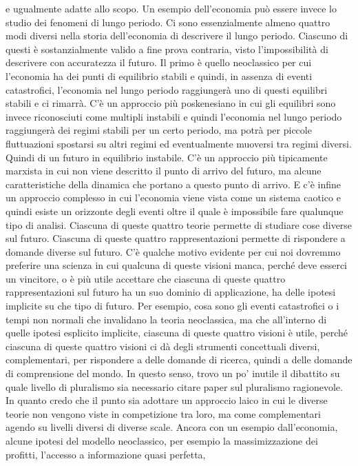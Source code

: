 \documentclass[a4paper, headings=standardclasses]{scrartcl}
\begin{document}
e ugualmente adatte allo scopo.
Un esempio dell'economia può essere invece lo studio dei fenomeni di lungo periodo.
Ci sono essenzialmente almeno quattro modi diversi nella storia dell'economia di descrivere il lungo periodo.
Ciascuno di questi è sostanzialmente valido a fine prova contraria, visto l'impossibilità di descrivere con accuratezza il futuro.
Il primo è quello neoclassico per cui l'economia ha dei punti di equilibrio stabili e quindi, in assenza di eventi catastrofici,
l'economia nel lungo periodo raggiungerà uno di questi equilibri stabili e ci rimarrà.
C'è un approccio più poskenesiano in cui gli equilibri sono invece riconosciuti come multipli instabili
e quindi l'economia nel lungo periodo raggiungerà dei regimi stabili per un certo periodo,
ma potrà per piccole fluttuazioni spostarsi su altri regimi ed eventualmente muoversi tra regimi diversi.
Quindi di un futuro in equilibrio instabile.
C'è un approccio più tipicamente marxista in cui non viene descritto il punto di arrivo del futuro,
ma alcune caratteristiche della dinamica che portano a questo punto di arrivo.
E c'è infine un approccio complesso in cui l'economia viene vista come un sistema caotico
e quindi esiste un orizzonte degli eventi oltre il quale è impossibile fare qualunque tipo di analisi.
Ciascuna di queste quattro teorie permette di studiare cose diverse sul futuro.
Ciascuna di queste quattro rappresentazioni permette di rispondere a domande diverse sul futuro.
C'è qualche motivo evidente per cui noi dovremmo preferire una scienza in cui
qualcuna di queste visioni manca, perché deve esserci un vincitore,
o è più utile accettare che ciascuna di queste quattro rappresentazioni
sul futuro ha un suo dominio di applicazione, ha delle ipotesi implicite su che tipo di futuro.
Per esempio, cosa sono gli eventi catastrofici o i tempi non normali che invalidano la teoria neoclassica,
ma che all'interno di quelle ipotesi esplicito implicite, ciascuna di queste quattro visioni è utile,
perché ciascuna di queste quattro visioni ci dà degli strumenti concettuali diversi, complementari,
per rispondere a delle domande di ricerca, quindi a delle domande di comprensione del mondo.
In questo senso, trovo un po' inutile il dibattito su quale livello di pluralismo sia necessario
citare paper sul pluralismo ragionevole.
In quanto credo che il punto sia adottare un approccio laico in cui le diverse teorie non vengono
viste in competizione tra loro, ma come complementari agendo su livelli diversi di diverse scale.
Ancora con un esempio dall'economia, alcune ipotesi del modello neoclassico,
per esempio la massimizzazione dei profitti, l'accesso a informazione quasi perfetta,
\end{document}
